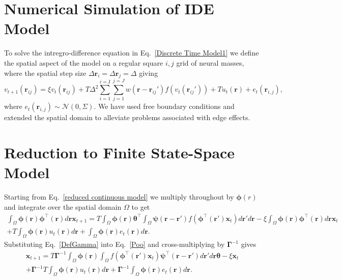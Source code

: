 \documentclass[12pt]{iopart}		%
\begin{document}
 \section{Numerical Simulation of IDE Model}\label{Space Discretization}
To solve the intregro-difference equation in Eq.~\ref{Discrete Time Model1} we define the spatial aspect of the model on a regular square $i,j$ grid of neural masses, where the spatial step size $\Delta \mathbf{r}_i = \Delta \mathbf{r}_j = \Delta $ giving
\begin{equation}\label{discrete space}
	v_{t+1}\left(\mathbf{r}_{ij}\right) = \xi v_t\left(\mathbf{r}_{ij}\right) + T \Delta^2 \sum_{i=1}^{i=I}{ \sum_{j=1}^{j=J}{ w\left( \mathbf{r}-\mathbf{r}_{ij}' \right)f\left( v_t\left( \mathbf{r}_{ij}'\right) \right)} } + T u_t\left(\mathbf{r}\right) + e_t(\mathbf{r}_{i,j}),
\end{equation}
where $e_t(\mathbf{r}_{i,j}) \sim \mathcal{N}\left(0,\Sigma\right)$.
We have used free boundary conditions and extended the spatial domain to alleviate problems associated with edge effects.
\section{Reduction to Finite State-Space Model}\label{Simplifying Decomposition}
Starting from Eq.~\ref{reduced continuous model} we multiply throughout by $\boldsymbol{\phi}(r)$ and integrate over the spatial domain $\Omega$ to get
\begin{eqnarray}\label{ReducingState}
	\int_\Omega  {\boldsymbol{\phi} \left(\mathbf{r}\right)\boldsymbol{\phi}^{\top}\left(\mathbf{r}\right) d\mathbf{r}} \mathbf{x}_{t+1} = T \int_\Omega  {\boldsymbol{\phi} (\mathbf{r}) \boldsymbol{\theta}^{\top} \int_\Omega  {\boldsymbol{\psi}  \left(\mathbf{r}-\mathbf{r}'\right) f\left(\boldsymbol{\phi}^{\top}\left(\mathbf{r}'\right) \mathbf{x}_t \right)d\mathbf{r}'}d\mathbf{r}} - \xi\int_\Omega {\boldsymbol{\phi}(\mathbf{r})\boldsymbol{\phi}^{\top}(\mathbf{r})d\mathbf{r}} \mathbf{x}_t \\
	+ T \int_\Omega{\boldsymbol{\phi} \left(\mathbf{r}\right) u_t\left(\mathbf{r}\right)d\mathbf{r}} + \int_\Omega{\boldsymbol{\phi} \left(\mathbf{r}\right) e_t\left(\mathbf{r}\right)d\mathbf{r}}.
\end{eqnarray}
Substituting Eq.~\ref{DefGamma} into Eq.~\ref{Poo} and cross-multiplying by $\boldsymbol{\Gamma}^{-1}$ gives 
\begin{eqnarray}\label{Homogeneous SS Model}
	\mathbf{x}_{t+1} = T\boldsymbol{\Gamma}^{ - 1}\int_\Omega {\boldsymbol{\phi}\left(\mathbf{r}\right) \int_\Omega {f\left(\boldsymbol{\phi}^{\top}\left(\mathbf{r}'\right)\mathbf{x}_t\right) \boldsymbol{\psi}^{\top} \left(\mathbf{r}-\mathbf{r}'\right)d\mathbf{r}'} d\mathbf{r}} \boldsymbol{\theta} - \xi \mathbf{x}_t \\
	+ \boldsymbol{\Gamma}^{-1}T \int_\Omega{\boldsymbol{\phi} \left(\mathbf{r}\right) u_t\left(\mathbf{r}\right)d\mathbf{r}} + \boldsymbol{\Gamma}^{-1} \int_\Omega{\boldsymbol{\phi}\left(\mathbf{r}\right)e_t\left(\mathbf{r}\right)d\mathbf{r}}.
\end{eqnarray}
\end{document}
